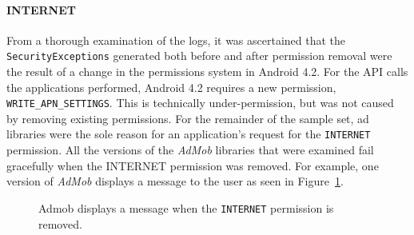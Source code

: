 \paragraph{\bfseries \ttfamily INTERNET}
From a thorough examination of the logs, it was ascertained that the \texttt{SecurityExceptions} generated both before and after permission removal were the result of a change in the permissions system in Android 4.2.  For the API calls the applications performed, Android 4.2 requires a new permission, \texttt{WRITE\_APN\_SETTINGS}.  This is technically under-permission, but was not caused by removing existing permissions.  For the remainder of the sample set, ad libraries were the sole reason for an application's request for the \texttt{INTERNET} permission.  All the versions of the \textit{AdMob} libraries that were examined fail gracefully when the INTERNET permission was removed.  For example,  one version of \textit{AdMob} displays a message to the user as seen in Figure~\ref{fig:removing}. 
\begin{figure}[h!]
\centerline{}
\caption{Admob displays a message when the \texttt{INTERNET} permission is removed.}
\label{fig:removing}
\end{figure}
